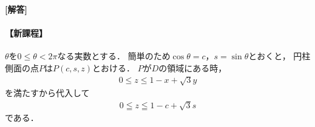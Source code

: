 \documentclass[../../main.tex]{subfiles}
\begin{document}
\begin{oframed}
  
\end{oframed}

{\bf [解答]}

\paragraph{【新課程】}
$\theta$を$0\le\theta<2\pi$なる実数とする．
簡単のため$\cos\theta = c$，$s = \sin\theta$とおくと，
円柱側面の点$P$は$P(c, s, z)$とおける．
$P$が$D$の領域にある時，
\begin{align}
  0\le z \le 1-x+\sqrt{3}y \label{eq:1}
\end{align}
を満たすから代入して
\begin{align}
  0 \leqq z \leqq 1 - c + \sqrt{3}s \label{eq:2}
\end{align}
である．
\end{document}
